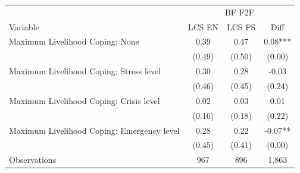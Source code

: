 \begin{tabular}{l*{3}c}
\hline\hline
 & \multicolumn{3}{c}{BF F2F}\\ 
Variable & LCS EN & LCS FS & Diff \\
\hline
Maximum Livelihood Coping: None&0.39&0.47&0.08***\\
&(0.49)&(0.50)&(0.00)\\
Maximum Livelihood Coping: Stress level&0.30&0.28&-0.03\\
&(0.46)&(0.45)&(0.24)\\
Maximum Livelihood Coping: Crisis level&0.02&0.03&0.01\\
&(0.16)&(0.18)&(0.22)\\
Maximum Livelihood Coping: Emergency level&0.28&0.22&-0.07**\\
&(0.45)&(0.41)&(0.00)\\
\hline
Observations & 967 & 896 & 1,863 \\
\hline\hline
\end{tabular}
